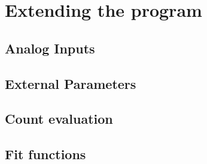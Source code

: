 \documentclass[11pt]{scrartcl}
\begin{document}
\section{Extending the program}

\subsection{Analog Inputs}

\subsection{External Parameters}

\subsection{Count evaluation}

\subsection{Fit functions}
\end{document}
